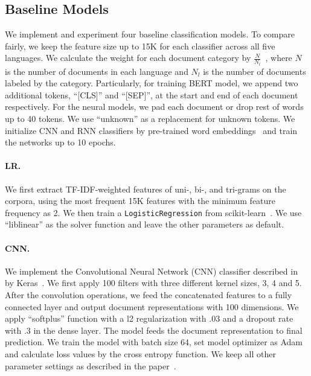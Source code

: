 \subsection{Baseline Models}
We implement and experiment four baseline classification models. 
To compare fairly, we keep the feature size up to 15K for each classifier across all five languages.
We calculate the weight for each document category by $\frac{N}{N_l}$~\cite{king2001logistic}, where $N$ is the number of documents in each language and $N_l$ is the number of documents labeled by the category.
Particularly, for training BERT model, we append two additional tokens, ``[CLS]'' and ``[SEP]'', at the start and end of each document respectively.
For the neural models, we pad each document or drop rest of words up to 40 tokens.
We use ``unknown'' as a replacement for unknown tokens.
We initialize CNN and RNN classifiers by pre-trained word embeddings~\cite{mikolov2013distributed,godin2015multimedia,bojanowski2017enriching,deriu2017leveraging} and train the networks up to 10 epochs.

\paragraph{LR.} 
We first extract TF-IDF-weighted features of uni-, bi-, and tri-grams on the corpora, using the most frequent 15K features with the minimum feature frequency as 2. 
We then train a \texttt{LogisticRegression} from scikit-learn~\cite{pedregosa2011scikit}. 
We use ``liblinear'' as the solver function and leave the other parameters as default.

\paragraph{CNN.} 
We implement the Convolutional Neural Network (CNN) classifier described in~\cite{kim2014convolutional,zimmerman2018improving} by Keras~\cite{chollet2015keras}.
We first apply 100 filters with three different kernel sizes, 3, 4 and 5.
After the convolution operations, we feed the concatenated features to a fully connected layer and output document representations with 100 dimensions.
We apply ``softplus'' function with a l2 regularization with $.03$ and a dropout rate with $.3$ in the dense layer.
The model feeds the document representation to final prediction.
We train the model with batch size 64, set model optimizer as Adam~\cite{kingma2014adam} and calculate loss values by the cross entropy function.
We keep all other parameter settings as described in the paper~\cite{kim2014convolutional}.



